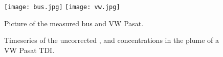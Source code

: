 \begin{figure}[htbp]
  \centering
  \texttt{[image: bus.jpg]}
  \hfill
  \texttt{[image: vw.jpg]}
  \caption{Picture of the measured bus and VW Pasat.}
  \label{fig:bus}
\end{figure}

\begin{figure}[htbp]
  \centering
  
  \caption{Timeseries of the uncorrected ,  and
     concentrations in the plume of a VW Pasat TDI.}
  \label{fig:vw-ts}
\end{figure}


